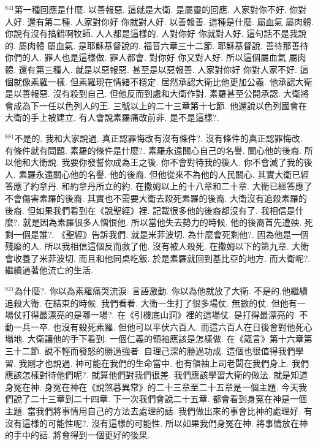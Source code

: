 \documentclass{book}
\begin{document}
$^{841}$第一種回應是什麼.
以善報惡.
這就是大衛.
是屬靈的回應.
人家對你不好.
你對人好.
還有第二種.
人家對你好 你就對人好.
以善報善.
這種是什麼.
屬血氣 屬肉體.
你說有沒有搞錯啊牧師.
人人都是這樣的.
人對你好 你就對人好.
這句話不是我說的.
屬肉體 屬血氣.
是耶穌基督說的.
福音六章三十二節.
耶穌基督說.
善待那善待你們的人.
罪人也是這樣做.
罪人都會.
對你好 你又對人好.
所以這個屬血氣 屬肉體.
還有第三種人.
就是以惡報惡.
甚至是以惡報善.
人家對你好 你對人家不好.
這個就像素羅一樣.
但素羅現在情緒不穩定.
居然承認大衛比他更加公義.
他承認大衛是以善報惡.
沒有殺到自己.
但他反而到處和大衛作對.
素羅甚至公開承認.
大衛將會成為下一任以色列人的王.
三號以上的二十三章第十七節.
他還說以色列國會在大衛的手上被建立.
有人會說素羅痛改前非.
是不是這樣?.

$^{881}$不是的.
我和大家說過.
真正認罪悔改有沒有條件?.
沒有條件的真正認罪悔改.
有條件就有問題.
素羅的條件是什麼?.
素羅永遠關心自己的名譽.
關心他的後裔.
所以他和大衛說.
我要你發誓你成為王之後.
你不會對待我的後人.
你不會滅了我的後人.
素羅永遠關心他的名譽.
他的後裔.
但他從來不為他的人民關心.
其實大衛已經答應了約拿丹.
和約拿丹所立的約.
在撒姆以上的十八章和二十章.
大衛已經答應了不會傷害素羅的後裔.
其實也不需要大衛去殺死素羅的後裔.
大衛沒有追殺素羅的後裔.
但如果我們看到在《說聖經》裡.
記載很多他的後裔都沒有了.
我相信是什麼?.
就是因為素羅很多人憎恨他.
所以當他失去勢力的時候.
他的後裔首先遭殃.
死剩一個是誰?.
《聖經》告訴我們.
就是米菲波切.
為什麼會死剩他?.
因為他是一個殘廢的人.
所以我相信這個反而救了他.
沒有被人殺死.
在撒姆以下的第九章.
大衛會收養了米菲波切.
而且和他同桌吃飯.
於是素羅就回到基比亞的地方.
而大衛呢?.
繼續過著他流亡的生活.

$^{921}$為什麼?.
你以為素羅痛哭流淚.
言語激動.
你以為他就放了大衛.
不是的,他繼續追殺大衛.
在結束的時候.
我們看看.
大衛一生打了很多場仗.
無數的仗.
但他有一場仗打得最漂亮的是哪一場?.
在《引機底山洞》裡的這場仗.
是打得最漂亮的.
不動一兵一卒.
也沒有殺死素羅.
但他可以平伏六百人.
而這六百人在日後會對他死心塌地.
大衛讓他的手下看到.
一個仁義的領袖應該是怎樣做.
在《箴言》第十六章第三十二節.
說不輕而發怒的勝過強者.
自理己深的勝過功成.
這個也很值得我們學習.
我剛才也說過.
神可能在我們的生命當中.
也有領袖上司老闆在我們身上.
我們應該怎樣對待他們呢?.
就算他們對我們很差.
我們應該學習大衛的做法.
就是知道身冤在神.
身冤在神在《說煞暮異常》的二十三章至二十五章是一個主題.
今天我們說了二十三章到二十四章.
下一次我們會說二十五章.
都會看到身冤在神是一個主題.
當我們將事情用自己的方法去處理的話.
我們做出來的事會比神的處理好.
有沒有這樣的可能性呢?.
沒有這樣的可能性.
所以如果我們身冤在神.
將事情放在神的手中的話.
將會得到一個更好的後果.
\end{document}
